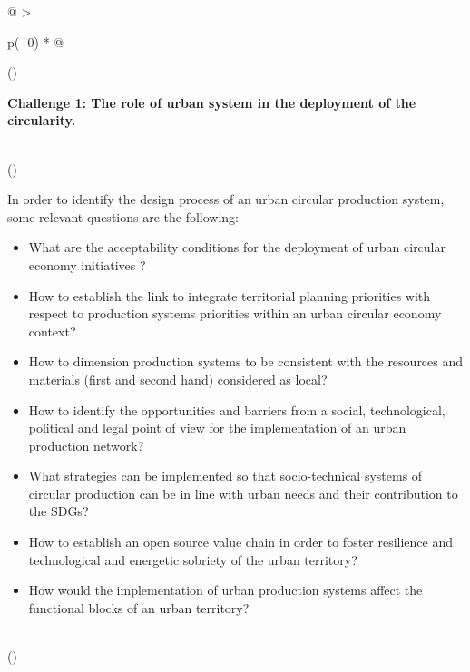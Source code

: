 \documentclass[
  11pt,
  a4paperpaper,
  onecolumn]{article}
\begin{document}
\begin{longtable}[]{@{}
  >{\raggedright\arraybackslash}p{(\columnwidth - 0\tabcolsep) * }@{}}
\toprule()
\begin{minipage}[b]{\linewidth}\raggedright
\textbf{Challenge 1: The role of urban system in the deployment of the
circularity.}
\end{minipage} \\
\midrule()
\endhead
\begin{minipage}[t]{\linewidth}\raggedright
In order to identify the design process of an urban circular production
system, some relevant questions are the following:

\begin{itemize}
\item
  What are the acceptability conditions for the deployment of urban
  circular economy initiatives ?
\item
  How to establish the link to integrate territorial planning priorities
  with respect to production systems priorities within an urban circular
  economy context?
\item
  How to dimension production systems to be consistent with the
  resources and materials (first and second hand) considered as local?
\item
  How to identify the opportunities and barriers from a social,
  technological, political and legal point of view for the
  implementation of an urban production network?
\item
  What strategies can be implemented so that socio-technical systems of
  circular production can be in line with urban needs and their
  contribution to the SDGs?
\item
  How to establish an open source value chain in order to foster
  resilience and technological and energetic sobriety of the urban
  territory?
\item
  How would the implementation of urban production systems affect the
  functional blocks of an urban territory?
\end{itemize}
\end{minipage} \\
\bottomrule()
\end{longtable}

\vspace{-0.5cm}
\end{document}
